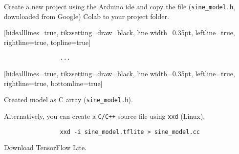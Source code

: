 \begin{frame}[fragile]
    \par Create a new project using the Arduino\textregistered{} \acs{ide} and copy the file (\texttt{sine\_model.h}, downloaded from Google) Colab to your project folder.
    \begin{listing}[H]
        [hidealllines=true, tikzsetting={draw=black, line width=0.35pt}, leftline=true, rightline=true, topline=true]
        \vspace{-1.25em}
        \begin{mdframed}[hidealllines=true, tikzsetting={draw=black, line width=0.35pt}, leftline=true, rightline=true]
            \begin{verbatim}
                ...
            \end{verbatim}
        \end{mdframed}
        \vspace{-1.25em}
        [hidealllines=true, tikzsetting={draw=black, line width=0.35pt}, leftline=true, rightline=true, bottomline=true]
        \caption{Created model as C array (\texttt{sine\_model.h}).}
        \label{lst:tflite:sinewave:model:c_array}
    \end{listing}
    \par Alternatively, you can create a \texttt{C/C++} source file using \texttt{xxd} (Linux).
    \begin{listing}[H]
        \begin{mdframed}
            \begin{verbatim}
                xxd -i sine_model.tflite > sine_model.cc
            \end{verbatim}
        \end{mdframed}
        \caption{Download TensorFlow Lite.}
        \label{lst:tflite:sinewave:model:conversion}
    \end{listing}
\end{frame}